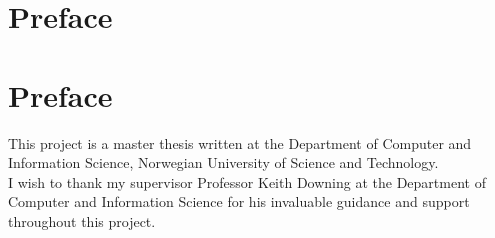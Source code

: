 \section*{Preface}


\section*{Preface}


\noindent This project is a master thesis written at the Department of Computer and Information Science, Norwegian University of Science and Technology.\\

\noindent I wish to thank my supervisor Professor Keith Downing at the Department of Computer and Information Science for his invaluable guidance and support throughout this project.\\